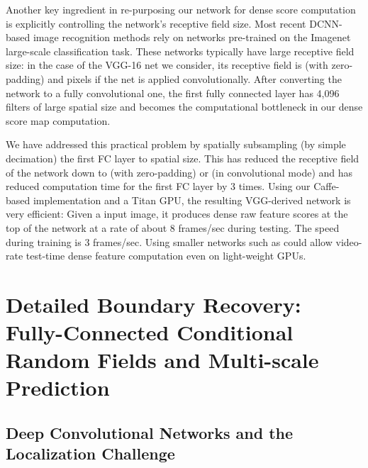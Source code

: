 Another key ingredient in re-purposing our network for dense score computation
is explicitly controlling the network's receptive field size. Most recent
DCNN-based image recognition methods rely on networks pre-trained on the
Imagenet large-scale classification task. These networks typically have large
receptive field size: in the case of the VGG-16 net we consider, its receptive
field is  (with zero-padding) and  pixels if the net
is applied convolutionally. After converting the network to a fully
convolutional one, the first fully connected layer has 4,096 filters
of large  spatial size and becomes the computational
bottleneck in our dense score map computation.



We have addressed this practical problem by spatially subsampling (by
simple decimation) the first FC layer to  spatial size. This
has reduced the receptive field of the network down to 
(with zero-padding) or  (in convolutional mode) and has
reduced computation time for the first FC layer by 3 times. Using our
Caffe-based implementation and a Titan GPU, the resulting VGG-derived
network is very efficient: Given a  input image, it
produces  dense raw feature scores at the top of the
network at a rate of about 8 frames/sec during testing. The speed
during training is 3 frames/sec. Using smaller networks such as
\citet{KrizhevskyNIPS2013} could allow video-rate test-time dense
feature computation even on light-weight GPUs.

\section{Detailed Boundary Recovery: Fully-Connected Conditional Random Fields and Multi-scale Prediction}
\label{sec:boundary-recovery}

\subsection{Deep Convolutional Networks and the Localization Challenge}
\label{sec:local-chal}

